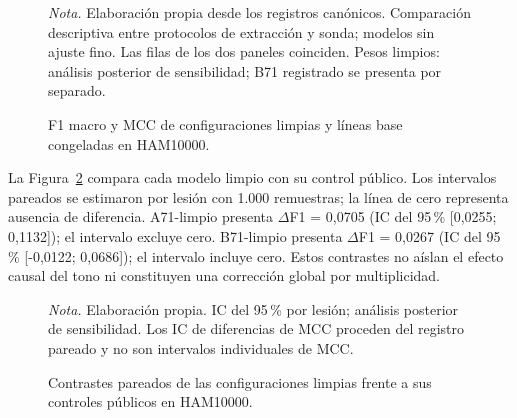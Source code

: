 \begin{figure}[!htbp]
\caption{F1 macro y MCC de configuraciones limpias y líneas base congeladas en HAM10000.}
\label{fig:clasificacion-ham-completa}
\centering

\par\smallskip
{\singlespacing\fontsize{11}{13}\selectfont\raggedright
\noindent\textit{Nota.} Elaboración propia desde los registros canónicos. Comparación descriptiva entre protocolos de extracción y sonda; modelos sin ajuste fino. Las filas de los dos paneles coinciden. Pesos limpios: análisis posterior de sensibilidad; B71 registrado se presenta por separado.\par}
\end{figure}
\FloatBarrier
La Figura~\ref{fig:contrastes-ham-limpio} compara cada modelo limpio con su control público. Los intervalos pareados se estimaron por lesión con 1.000 remuestras; la línea de cero representa ausencia de diferencia. A71-limpio presenta $\Delta$F1 = 0,0705 (IC del 95\,\% [0,0255; 0,1132]); el intervalo excluye cero. B71-limpio presenta $\Delta$F1 = 0,0267 (IC del 95\,\% [-0,0122; 0,0686]); el intervalo incluye cero. Estos contrastes no aíslan el efecto causal del tono ni constituyen una corrección global por multiplicidad.

\begin{figure}[!htbp]
\caption{Contrastes pareados de las configuraciones limpias frente a sus controles públicos en HAM10000.}
\label{fig:contrastes-ham-limpio}
\centering

\par\smallskip
{\singlespacing\fontsize{11}{13}\selectfont\raggedright
\noindent\textit{Nota.} Elaboración propia. IC del 95\,\% por lesión; análisis posterior de sensibilidad. Los IC de diferencias de MCC proceden del registro pareado y no son intervalos individuales de MCC.\par}
\end{figure}
\FloatBarrier
